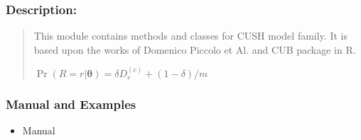 \documentclass[letterpaper,10pt,english]{sphinxmanual}
\begin{document}
\subsubsection{Description:}
\label{\detokenize{cubmods:id115}}\begin{quote}

\sphinxAtStartPar
This module contains methods and classes
for CUSH model family.
It is based upon the works of Domenico
Piccolo et Al. and CUB package in R.

\sphinxAtStartPar
\(\Pr(R=r|\pmb \theta) = \delta D_r^{(c)} + (1 - \delta)/m\)
\end{quote}


\subsubsection{Manual and Examples}
\label{\detokenize{cubmods:id116}}\begin{itemize}
\item {} 
\sphinxAtStartPar
Manual 

\end{itemize}
\end{document}
